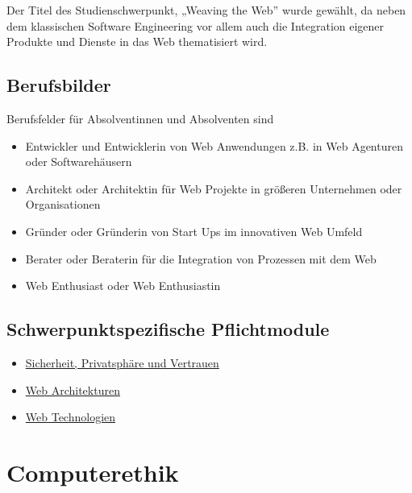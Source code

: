 Der Titel des Studienschwerpunkt, „Weaving the Web'' wurde gewählt, da
neben dem klassischen Software Engineering vor allem auch die
Integration eigener Produkte und Dienste in das Web thematisiert wird.

\section*{Berufsbilder\label{/mi-2017/modulbeschreibungen-master/schwerpunkt-weaving-the-web}}\label{berufsbilderpathlabelmi-2017modulbeschreibungen-masterschwerpunkt-weaving-the-web}

Berufsfelder für Absolventinnen und Absolventen sind

\begin{itemize}
\tightlist
\item
  Entwickler und Entwicklerin von Web Anwendungen z.B. in Web Agenturen
  oder Softwarehäusern
\item
  Architekt oder Architektin für Web Projekte in größeren Unternehmen
  oder Organisationen
\item
  Gründer oder Gründerin von Start Ups im innovativen Web Umfeld
\item
  Berater oder Beraterin für die Integration von Prozessen mit dem Web
\item
  Web Enthusiast oder Web Enthusiastin
\end{itemize}

\section*{Schwerpunktspezifische
Pflichtmodule\label{/mi-2017/modulbeschreibungen-master/schwerpunkt-weaving-the-web}}\label{schwerpunktspezifische-pflichtmodulepathlabelmi-2017modulbeschreibungen-masterschwerpunkt-weaving-the-web}

\begin{itemize}
\tightlist
\item
  \hyperref[/mi-2017/modulbeschreibungen-master/MA_WTW_Modul_IT-Sicherheit]{Sicherheit,
  Privatsphäre und Vertrauen}
\item
  \hyperref[/mi-2017/modulbeschreibungen-master/MA_WTW_Modul_Web-Architekturen]{Web
  Architekturen}
\item
  \hyperref[/mi-2017/modulbeschreibungen-master/MA_WTW_Modul_Web-Technologien]{Web
  Technologien}
\end{itemize}

\chapter{Computerethik\label{/mi-2017/modulbeschreibungen-master/MA_All_Computerethik}}\label{computerethikpathlabelmi-2017modulbeschreibungen-mastermaux5fallux5fcomputerethik}

